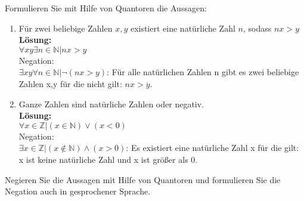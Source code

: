 \documentclass[accentcolor=2d]{tudaexercise}
\begin{document}
\begin{task}{}
Formulieren Sie mit Hilfe von Quantoren die Aussagen:
\begin{enumerate}[label=(\alph*)]
	\item Für zwei beliebige Zahlen $x,y$ existiert eine natürliche Zahl $n$, sodass $nx > y$\\
	\textbf{Lösung:}\\
	$\forall xy\exists n \in \mathbb{N}| nx>y $\\
	Negation: \\
	$\exists xy\forall n \in \mathbb{N}| \lnot (nx>y)$: Für alle natürlichen Zahlen n gibt es zwei beliebige Zahlen x,y für die nicht gilt: $nx>y$.
	\item Ganze Zahlen sind natürliche Zahlen oder negativ.\\
	\textbf{Lösung:}\\
	$\forall x \in \mathbb{Z}| (x \in \mathbb{N})\lor (x < 0)$\\
	Negation:\\
	$\exists x \in \mathbb{Z}| (x \not\in \mathbb{N})\land (x>0)$: Es existiert eine natürliche Zahl x für die gilt: x ist keine natürliche Zahl und x ist größer als 0.
\end{enumerate}
Negieren Sie die Aussagen mit Hilfe von Quantoren und formulieren Sie die Negation auch in gesprochener Sprache.
\end{task}
\end{document}
